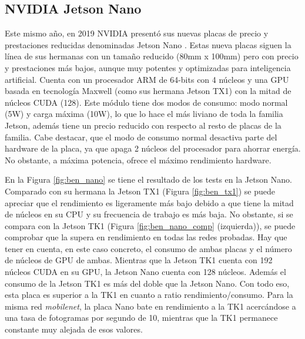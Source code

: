 \subsection{NVIDIA Jetson Nano}
\label{sec:jnano}

Este mismo año, en 2019 NVIDIA presentó sus nuevas placas de precio y prestaciones reducidas denominadas Jetson Nano \cite{jetsonnano}. Estas nueva placas siguen la línea de sus hermanas con un tamaño reducido (80mm x 100mm) pero con precio y prestaciones más bajos, aunque muy potentes y optimizadas para inteligencia artificial. Cuenta con un procesador ARM de 64-bits con 4 núcleos y una GPU basada en tecnología Maxwell (como sus hermana Jetson TX1) con la mitad de núcleos CUDA (128). Este módulo tiene dos modos de consumo: modo normal (5W) y carga máxima (10W), lo que lo hace el más liviano de toda la familia Jetson, además tiene un precio reducido con respecto al resto de placas de la familia. Cabe destacar, que el modo de consumo normal desactiva parte del hardware de la placa, ya que apaga 2 núcleos del procesador para ahorrar energía. No obstante, a máxima potencia, ofrece el máximo rendimiento hardware.

En la Figura \ref{fig:ben_nano} se tiene el resultado de los tests en la Jetson Nano. Comparado con su hermana la Jetson TX1 (Figura \ref{fig:ben_tx1}) se puede apreciar que el rendimiento es ligeramente más bajo debido a que tiene la mitad de núcleos en su CPU y su frecuencia de trabajo es más baja. No obstante, si se compara con la Jetson TK1 (Figura \ref{fig:ben_nano_comp} (izquierda)), se puede comprobar que la supera en rendimiento en todas las redes probadas. Hay que tener en cuenta, en este caso concreto, el consumo de ambas placas y el número de núcleos de GPU de ambas. Mientras que la Jetson TK1 cuenta con 192 núcleos CUDA en su GPU, la Jetson Nano cuenta con 128 núcleos. Además el consumo de la Jetson TK1 es más del doble que la Jetson Nano. Con todo eso, esta placa es superior a la TK1 en cuanto a ratio rendimiento/consumo. Para la misma red \textit{mobilenet}, la placa Nano bate en rendimiento a la TK1 acercándose a una tasa de fotogramas por segundo de 10, mientras que la TK1 permanece constante muy alejada de esos valores.

